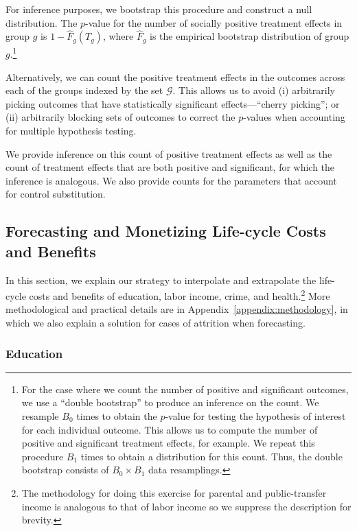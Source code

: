 For inference purposes, we bootstrap this procedure and construct a null distribution. The $p$-value for the number of socially positive treatment effects in group $g$ is $1 - \widehat{F}_{g} \left( T_{g} \right)$, where $ \widehat{F}_{g}$ is the empirical bootstrap distribution of group $g$.\footnote{For the case where we count the number of positive and significant outcomes, we use a ``double bootstrap'' to produce an inference on the count. We resample $B_{0}$ times to obtain the $p$-value for testing the hypothesis of interest for each individual outcome. This allows us to compute the number of positive and significant treatment effects, for example. We repeat this procedure $B_{1}$ times to obtain a distribution for this count. Thus, the double bootstrap consists of $B_{0} \times B_{1}$ data resamplings.}

Alternatively, we can count the positive treatment effects in the outcomes across each of the groups indexed by the set $\mathcal{G}$. This allows us to avoid (i) arbitrarily picking outcomes that have statistically significant effects---``cherry picking''; or (ii) arbitrarily blocking sets of outcomes to correct the $p$-values when accounting for multiple hypothesis testing. 

We provide inference on this count of positive treatment effects as well as the count of treatment effects that are both positive and significant, for which the inference is analogous. We also provide counts for the parameters that account for control substitution. 

\subsection{Forecasting and Monetizing Life-cycle Costs and Benefits} \label{section:cbamethodology}

\noindent In this section, we explain our strategy to interpolate and extrapolate the life-cycle costs and benefits of education, labor income, crime, and health.\footnote{The methodology for doing this exercise for parental and public-transfer income is analogous to that of labor income so we suppress the description for brevity.} More methodological and practical details are in Appendix~\ref{appendix:methodology}, in which we also explain a solution for cases of attrition when forecasting. 

\subsubsection{Education}

